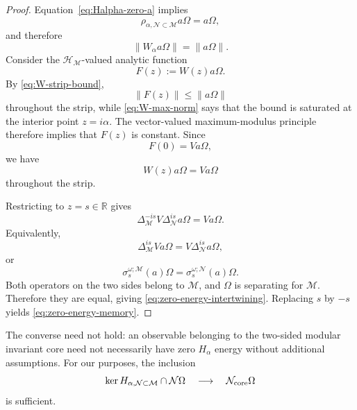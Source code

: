 \documentclass[a4paper,11pt]{article}
\theoremstyle{definition}
\newcommand{\mN}{\mathcal{N}}
\newcommand{\mH}{\mathcal{H}}
\newcommand{\mM}{\mathcal{M}}
\begin{document}
\begin{proof}
Equation~\eqref{eq:Halpha-zero-a} implies
\begin{equation}
    \rho_{\alpha,\mN\subset\mM}a\Omega
    =
    a\Omega,
\end{equation}
and therefore
\begin{equation}
    \|W_\alpha a\Omega\|
    =
    \|a\Omega\|.
    \label{eq:W-max-norm}
\end{equation}
Consider the $\mH_{\mM}$-valued analytic function
\begin{equation}
    F(z)
    :=
    W(z)a\Omega .
\end{equation}
By \eqref{eq:W-strip-bound},
\begin{equation}
    \|F(z)\|
    \leq
    \|a\Omega\|
\end{equation}
throughout the strip, while \eqref{eq:W-max-norm} says that the bound is
saturated at the interior point $z=i\alpha$. The vector-valued
maximum-modulus principle therefore implies that $F(z)$ is constant.
Since
\begin{equation}
    F(0)=Va\Omega,
\end{equation}
we have
\begin{equation}
    W(z)a\Omega=Va\Omega
\end{equation}
throughout the strip.

Restricting to $z=s\in\mathbb R$ gives
\begin{equation}
    \Delta_{\mM}^{-is}
    V\Delta_{\mN}^{is}a\Omega
    =
    Va\Omega.
\end{equation}
Equivalently,
\begin{equation}
    \Delta_{\mM}^{is}Va\Omega
    =
    V\Delta_{\mN}^{is}a\Omega,
\end{equation}
or
\begin{equation}
    \sigma_s^{\omega;\mM}(a)\Omega
    =
    \sigma_s^{\omega;\mN}(a)\Omega.
\end{equation}
Both operators on the two sides belong to $\mM$, and $\Omega$ is
separating for $\mM$. Therefore they are equal, giving
\eqref{eq:zero-energy-intertwining}. Replacing $s$ by $-s$ yields
\eqref{eq:zero-energy-memory}.
\end{proof}

The converse need not hold: an observable belonging to the two-sided modular
invariant core need not necessarily have zero $H_\alpha$ energy without additional
assumptions. For our purposes, the inclusion
\begin{equation}
    \ker H_{\alpha,\mN\subset\mM}\cap\mN\Omega
    \quad\longrightarrow\quad
    \mN_{\rm core}\Omega
\end{equation}
is sufficient.
\end{document}
